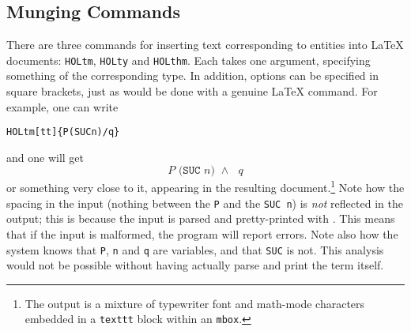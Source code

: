 \subsection{Munging Commands}
\newcommand{\holtm}{\texttt{\bs{}HOLtm}}
\newcommand{\holty}{\texttt{\bs{}HOLty}}
\newcommand{\holthm}{\texttt{\bs{}HOLthm}}
There are three commands for inserting text corresponding to \HOL{} entities into \LaTeX{} documents: \holtm, \holty{} and \holthm.
%
Each takes one argument, specifying something of the corresponding \HOL{} type.
%
In addition, options can be specified in square brackets, just as would be done with a genuine \LaTeX{} command.
%
For example, one can write
\begin{alltt}
   \holtm{}[tt]\{P(SUC n) /\bs{} q\}
\end{alltt}
and one will get \[
  \texttt{$P$ (SUC $n$) $\land$ $q$}
\]
or something very close to it, appearing in the resulting document.\footnote{The output is a mixture of typewriter font and math-mode characters embedded in a \texttt{\bs{}texttt} block within an \texttt{\bs{}mbox}.}
%
Note how the spacing in the input (nothing between the \texttt{P} and the \texttt{SUC n}) is \emph{not} reflected in the output; this is because the input is parsed and pretty-printed with \HOL{}.
%
This means that if the \HOL{} input is malformed, the \munge{} program will report errors.
%
Note also how the system knows that \texttt{P}, \texttt{n} and \texttt{q} are variables, and that \texttt{SUC} is not.
%
This analysis would not be possible without having \HOL{} actually parse and print the term itself.


